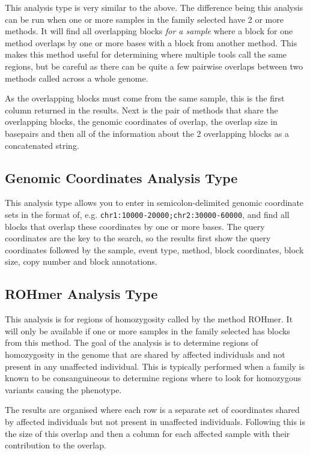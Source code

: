 \documentclass[11pt, a4paper]{article}
\begin{document}
This analysis type is very similar to the  above. The difference being this analysis can be run when one or more samples in the family selected have 2 or more methods. It will find all overlapping blocks \textit{for a sample} where a block for one method overlaps by one or more bases with a block from another method. This makes this method useful for determining where multiple tools call the same regions, but be careful as there can be quite a few pairwise overlaps between two methods called across a whole genome.

As the overlapping blocks must come from the same sample, this is the first column returned in the results. Next is the pair of methods that share the overlapping blocks, the genomic coordinates of overlap, the overlap size in basepairs and then all of the information about the 2 overlapping blocks as a concatenated string.

\subsection{Genomic Coordinates Analysis Type}

This analysis type allows you to enter in semicolon-delimited genomic coordinate sets in the format of, e.g. \texttt{chr1:10000-20000;chr2:30000-60000}, and find all blocks that overlap these coordinates by one or more bases. The query coordinates are the key to the search, so the results first show the query coordinates followed by the sample, event type, method, block coordinates, block size, copy number and block annotations.

\subsection{ROHmer Analysis Type}

This analysis is for regions of homozygosity called by the method ROHmer. It will only be available if one or more samples in the family selected has blocks from this method. The goal of the analysis is to determine regions of homozygosity in the genome that are shared by affected individuals and not present in any unaffected individual. This is typically performed when a family is known to be consanguineous to determine regions where to look for homozygous variants causing the phenotype.

The results are organised where each row is a separate set of coordinates shared by affected individuals but not present in unaffected individuals. Following this is the size of this overlap and then a column for each affected sample with their contribution to the overlap.
\end{document}
